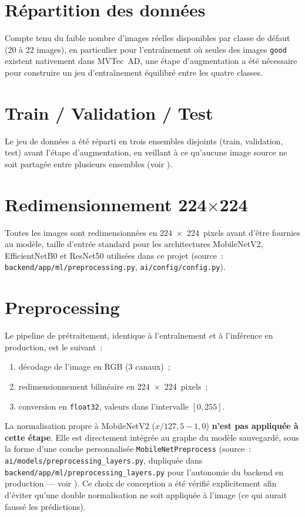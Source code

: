 \section{R\'epartition des donn\'ees}

Compte tenu du faible nombre d'images r\'eelles disponibles par classe de d\'efaut (20 \`a 22 images), en particulier pour l'entra\^inement o\`u seules des images \texttt{good} existent nativement dans MVTec~AD, une \'etape d'augmentation a \'et\'e n\'ecessaire pour construire un jeu d'entra\^inement \'equilibr\'e entre les quatre classes.

\section{Train / Validation / Test}

Le jeu de donn\'ees a \'et\'e r\'eparti en trois ensembles disjoints (train, validation, test) avant l'\'etape d'augmentation, en veillant \`a ce qu'aucune image source ne soit partag\'ee entre plusieurs ensembles (voir ).

\section{Redimensionnement 224$\times$224}

Toutes les images sont redimensionn\'ees en 224~$\times$~224~pixels avant d'\^etre fournies au mod\`ele, taille d'entr\'ee standard pour les architectures MobileNetV2, EfficientNetB0 et ResNet50 utilis\'ees dans ce projet (source~: \texttt{backend/app/ml/preprocessing.py}, \texttt{ai/config/config.py}).

\section{Preprocessing}

Le pipeline de pr\'etraitement, identique \`a l'entra\^inement et \`a l'inf\'erence en production, est le suivant~:
\begin{enumerate}
  \item d\'ecodage de l'image en RGB (3 canaux)~;
  \item redimensionnement bilin\'eaire en 224~$\times$~224~pixels~;
  \item conversion en \texttt{float32}, valeurs dans l'intervalle $[0, 255]$.
\end{enumerate}

La normalisation propre \`a MobileNetV2 ($x / 127{,}5 - 1{,}0$) \textbf{n'est pas appliqu\'ee \`a cette \'etape}. Elle est directement int\'egr\'ee au graphe du mod\`ele sauvegard\'e, sous la forme d'une couche personnalis\'ee \texttt{MobileNetPreprocess} (source~: \texttt{ai/models/preprocessing\_layers.py}, dupliqu\'ee dans \texttt{backend/app/ml/preprocessing\_layers.py} pour l'autonomie du backend en production --- voir ). Ce choix de conception a \'et\'e v\'erifi\'e explicitement afin d'\'eviter qu'une double normalisation ne soit appliqu\'ee \`a l'image (ce qui aurait fauss\'e les pr\'edictions).

